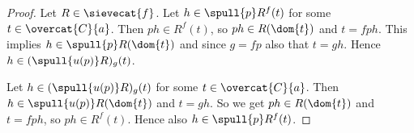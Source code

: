 
\begin{proof}
Let $R\in \sievecat{f}$.
Let $h \in \spull{p}R^f(t)$ for some $t\in \overcat{C}{a}$. 
Then $ph \in R^f(t)$, so $ph \in R(\dom{t})$ and $t = fph$.
This implies $h\in \spull{p}R(\dom{t})$ and since $g = fp$ also that $t = gh$.
Hence $h\in (\spull{u(p)}R)_g(t)$.

Let $h \in (\spull{u(p)}R)_g(t)$ for some $t\in \overcat{C}{a}$.
Then $h \in \spull{u(p)}R(\dom{t})$ and $t = gh$.
So we get $ph \in R(\dom{t})$ and $t = fph$, 
so $ph\in R^f(t)$.
Hence also $h\in \spull{p}R^f(t)$.
\end{proof}
